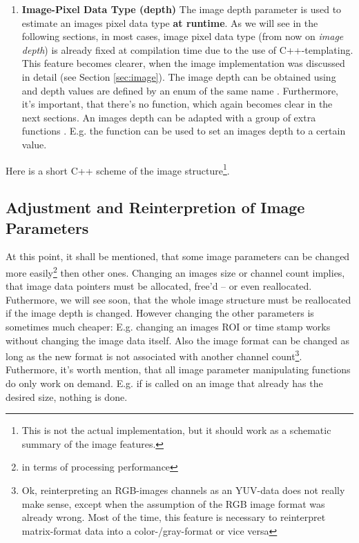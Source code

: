\begin{enumerate}
\item \textbf{Image-Pixel Data Type (depth)}
The image depth parameter is used to estimate an images pixel data type \textbf{at runtime}. As we will see in the following sections, in most cases, image pixel data type (from now on \emph{image depth}) is already fixed at compilation time due to the use of C++-templating. This feature becomes clearer, when the image implementation was discussed in detail (see Section \ref{sec:image}). The image depth can be obtained using  and depth values are defined by an enum of the same name . Furthermore, it's important, that there's no  function, which again becomes clear in the next sections. An images depth can be adapted with a group of extra functions . E.g. the function   can be used to set an images depth to a certain value. 

\end{enumerate}

Here is a short C++ scheme of the image structure\footnote{This is not the actual implementation, but it should work as a schematic summary of the image features.}.



\subsection {Adjustment and Reinterpretion of Image Parameters}
At this point, it shall be mentioned, that some image parameters can be changed more easily\footnote{in terms of processing performance} then other ones. Changing an images size or channel count implies, that image data pointers must be allocated, free'd -- or even reallocated. Futhermore, we will see soon, that the whole image structure must be reallocated if the image depth is changed. However changing the other parameters is sometimes much cheaper: E.g. changing an images ROI or time stamp works without changing the image data itself. Also the image format can be changed as long as the new format is not associated with another channel count\footnote{Ok, reinterpreting an RGB-images channels as an YUV-data does not really make sense, except when the assumption of the RGB image format was already wrong. Most of the time, this feature is necessary to reinterpret matrix-format data into a color-/gray-format or vice versa}.\\
Futhermore, it's worth mention, that all image parameter manipulating functions do only work on demand. E.g. if  is called on an image that already has the desired size, nothing is done.


